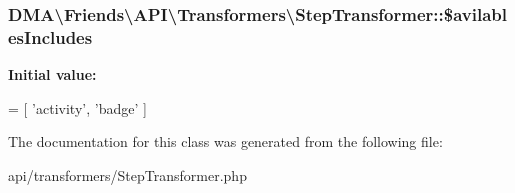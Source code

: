 \subsubsection[{\$avilables\+Includes}]{\setlength{\rightskip}{0pt plus 5cm}D\+M\+A\textbackslash{}\+Friends\textbackslash{}\+A\+P\+I\textbackslash{}\+Transformers\textbackslash{}\+Step\+Transformer\+::\$avilables\+Includes\hspace{0.3cm}{\ttfamily [protected]}}\label{classDMA_1_1Friends_1_1API_1_1Transformers_1_1StepTransformer_a4ef32b466440209cb24dc381c2b0ae7a}
{\bfseries Initial value\+:}
\begin{DoxyCode}
= [
            \textcolor{stringliteral}{'activity'},
            \textcolor{stringliteral}{'badge'}
    ]
\end{DoxyCode}


The documentation for this class was generated from the following file\+:\begin{DoxyCompactItemize}
\item 
api/transformers/Step\+Transformer.\+php\end{DoxyCompactItemize}
